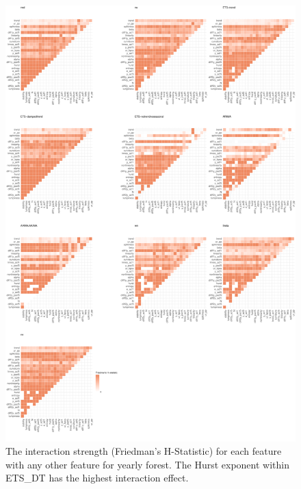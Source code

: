 \documentclass[11pt,a4paper,]{article}
\begin{document}
\begin{figure}
\centering
\includegraphics{figures/friedmany-1.pdf}
\caption{\label{fig:friedmany}The interaction strength (Friedman's H-Statistic) for each feature with any other feature for yearly forest. The Hurst exponent within ETS\_DT has the highest interaction effect.}
\end{figure}
\end{document}
